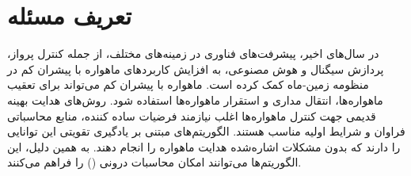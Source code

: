 \section{تعریف مسئله}
\noindent  در سال‌های اخیر، پیشرفت‌های فناوری در زمینه‌های مختلف، از جمله کنترل پرواز، پردازش سیگنال و هوش مصنوعی، به افزایش کاربردهای ماهواره با پیشران کم در منظومه زمین‐ماه کمک کرده است. ماهواره با پیشران کم می‌تواند برای تعقیب ماهواره‌ها، انتقال مداری و استقرار ماهواره‌ها استفاده شود.
روش‌های هدایت بهینه قدیمی جهت کنترل ماهواره‌ها اغلب نیازمند فرضیات ساده کننده، منابع محاسباتی فراوان و شرایط اولیه مناسب هستند. الگوریتم‌های مبتنی بر یادگیری تقویتی این توانایی را دارند که بدون مشکلات اشاره‌شده هدایت ماهواره را انجام دهند. به همین دلیل، این الگوریتم‌ها می‌توانند امکان محاسبات درونی 
()  
را فراهم می‌کنند.

